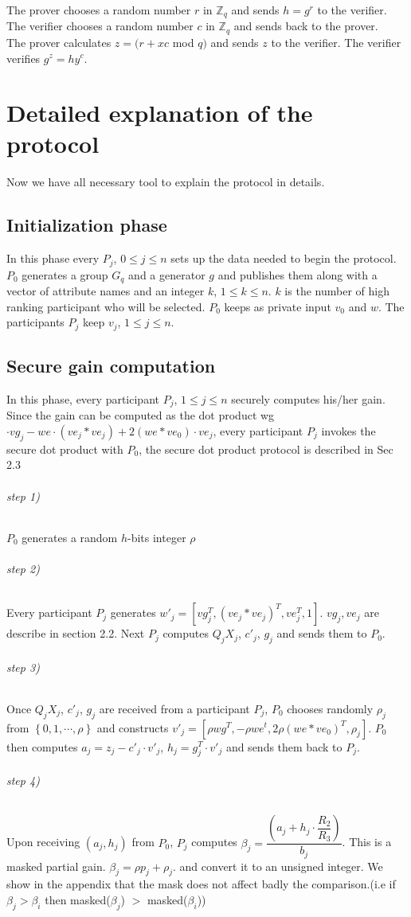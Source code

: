 \documentclass[11pt, a4paper, oneside, openright]{book} %
\begin{document}
The prover chooses a random number $r$ in $\mathbb{Z}_q$ and sends
 $h = g^r$ to the verifier.\\
The verifier chooses a random number $c$ in $\mathbb{Z}_q$ and
sends back to the prover.\\
 The prover calculates $z = (r + xc$ mod $q)$ and sends $z$
to the verifier.
The verifier verifies $g^z = hy^c$.\\

\chapter{Detailed explanation of the protocol}
Now we have all necessary tool to explain the protocol in details.
\section{Initialization phase}
In this phase every $P_j$, $0 \leq j \leq n$  sets up the data needed to begin the protocol.\\
$P_0$ generates a group $G_q$ and a generator $g$ and publishes them along with a vector of attribute names and an integer $k$, $1\leq k\leq n$. $k$ is the number of high ranking participant who will be selected. 
$P_0$ keeps as private input $v_0$ and $w$. The participants $P_j$ keep $v_j$, $1 \leq j\leq n$.

\section{Secure gain computation}
In this phase, every participant $P_j$, $1 \leq j \leq n$ securely computes his/her gain. Since the gain can be computed as the dot product wg$\cdot vg_j - we \cdot (ve_j*ve_j)+2(we*ve_0)\cdot ve_j$, every participant $P_j$ invokes the secure dot product with $P_0$, the secure dot product protocol is described in Sec 2.3
\subparagraph{step 1)}
 $P_0$ generates a random $h$-bits integer $\rho$
 \subparagraph{step 2)}
 Every participant $P_j$ generates $w'_j = [vg_j^T,(ve_j*ve_j)^T, ve_j^T,1]$. $vg_j, ve_j$ are describe in section 2.2. Next $P_j$ computes $Q_jX_j$, $c'_j$, $g_j$ and sends them to $P_0$.
 \subparagraph{step 3)} 
	Once $Q_jX_j$, $c'_j$, $g_j$ are received from a participant $P_j$, $P_0$ chooses randomly $\rho _j$ from $\left\lbrace 0,1,\cdots , \rho \right\rbrace$	and constructs $v'_j = 	[\rho wg^T,-\rho we^t, 2\rho (we*ve_0)^T, \rho _j]$.
	 $P_0$ then computes $a_j= z_j - c'_j\cdot v'_j$, $h_j = g_j^T\cdot v'_j$ and sends them back to $P_j$.
\subparagraph{step 4)}
	Upon receiving $(a_j,h_j)$ from $P_0$, $P_j$ computes $\beta _j = \dfrac{(a_j+h_j\cdot \dfrac{R_2}{R_3})}{b_j}$. This is a masked partial gain. $\beta _j = \rho p_j + \rho _j$. and convert it to an unsigned integer. We show in the appendix that the mask does not affect badly the comparison.(i.e if $\beta_j>\beta_i$ then masked($\beta _j$) $>$ masked($\beta _i$))
 
\end{document}
